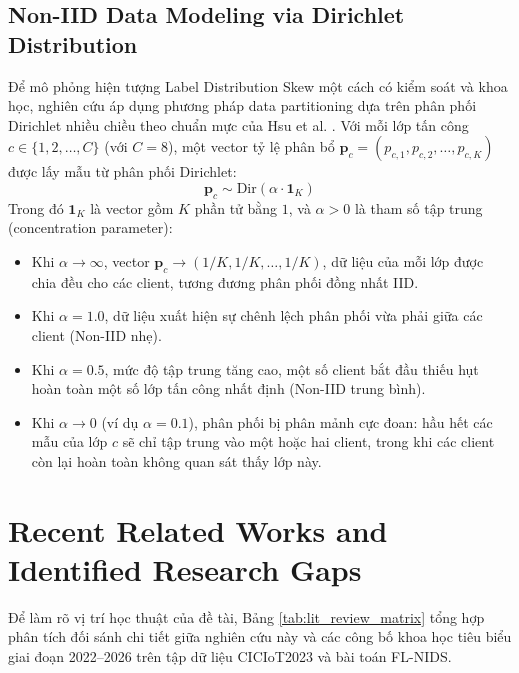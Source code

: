 \subsection{Non-IID Data Modeling via Dirichlet Distribution}
Để mô phỏng hiện tượng Label Distribution Skew một cách có kiểm soát và khoa học, nghiên cứu áp dụng phương pháp data partitioning dựa trên phân phối Dirichlet nhiều chiều theo chuẩn mực của Hsu et al. \cite{hsu2019measuring}. Với mỗi lớp tấn công $c \in \{1, 2, \dots, C\}$ (với $C=8$), một vector tỷ lệ phân bổ $\mathbf{p}_c = (p_{c, 1}, p_{c, 2}, \dots, p_{c, K})$ được lấy mẫu từ phân phối Dirichlet:
\begin{equation}
    \mathbf{p}_c \sim \text{Dir}(\alpha \cdot \mathbf{1}_K)
    \label{eq:dirichlet}
\end{equation}
Trong đó $\mathbf{1}_K$ là vector gồm $K$ phần tử bằng $1$, và $\alpha > 0$ là tham số tập trung (concentration parameter):
\begin{itemize}
    \item Khi $\alpha \to \infty$, vector $\mathbf{p}_c \to (1/K, 1/K, \dots, 1/K)$, dữ liệu của mỗi lớp được chia đều cho các client, tương đương phân phối đồng nhất IID.
    \item Khi $\alpha = 1.0$, dữ liệu xuất hiện sự chênh lệch phân phối vừa phải giữa các client (Non-IID nhẹ).
    \item Khi $\alpha = 0.5$, mức độ tập trung tăng cao, một số client bắt đầu thiếu hụt hoàn toàn một số lớp tấn công nhất định (Non-IID trung bình).
    \item Khi $\alpha \to 0$ (ví dụ $\alpha = 0.1$), phân phối bị phân mảnh cực đoan: hầu hết các mẫu của lớp $c$ sẽ chỉ tập trung vào một hoặc hai client, trong khi các client còn lại hoàn toàn không quan sát thấy lớp này.
\end{itemize}

\section{Recent Related Works and Identified Research Gaps}
\label{sec:lit_related}
Để làm rõ vị trí học thuật của đề tài, Bảng \ref{tab:lit_review_matrix} tổng hợp phân tích đối sánh chi tiết giữa nghiên cứu này và các công bố khoa học tiêu biểu giai đoạn 2022--2026 trên tập dữ liệu CICIoT2023 và bài toán FL-NIDS.

